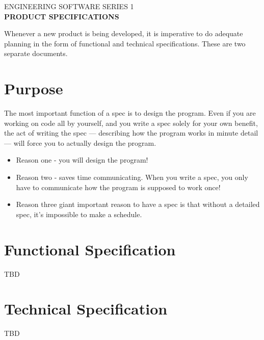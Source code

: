 \documentclass[letterpaper,12pt]{article}
\newcommand{\policyletter}[2]{%
	\begin{center}
		\vspace*{0.25\baselineskip} %
		{\large #1} \\ %
		\vspace{0.5\baselineskip} %
		{\LARGE \textbf{#2}} %
		\vspace{\baselineskip} %
	\end{center}
}
\begin{document}
	\thispagestyle{fancy}
	
	\policyletter{ENGINEERING SOFTWARE SERIES 1}{PRODUCT SPECIFICATIONS}
	
	Whenever a new product is being developed, it is imperative to do adequate planning in the form of functional and technical specifications. These are two separate documents.
	\section{Purpose}
	The most important function of a spec is to design the program. Even if you are working on code all by yourself, and you write a spec solely for your own benefit, the act of writing the spec — describing how the program works in minute detail — will force you to actually design the program.
	\begin{itemize} 
	\item Reason one - you will design the program!
	
	\item Reason two - saves time communicating. When you write a spec, you only have to communicate how the program is supposed to work once!
	
	\item Reason three giant important reason to have a spec is that without a detailed spec, it’s impossible to make a schedule.
	\end{itemize}
	
	\section{Functional Specification}
	TBD
	
	\section{Technical Specification}
	TBD
	
\end{document}
